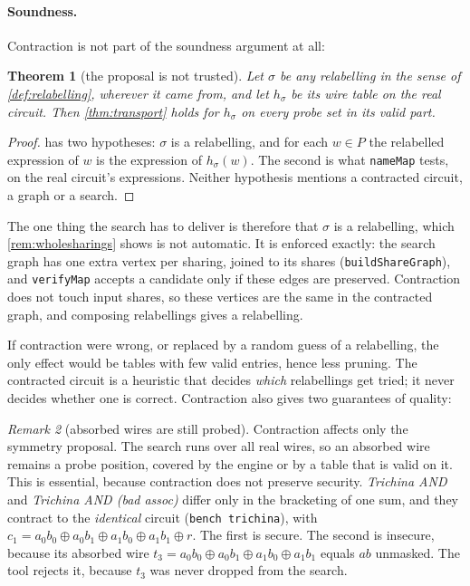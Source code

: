 \documentclass[11pt,a4paper]{article}
\newtheorem{theorem}{Theorem}[section]
\theoremstyle{definition}
\theoremstyle{remark}
\newtheorem{remark}[theorem]{Remark}
\newcommand{\code}[1]{\texttt{\small #1}}
\begin{document}
\paragraph{Soundness.}  Contraction is not part of the soundness argument at all:

\begin{theorem}[the proposal is not trusted]\label{thm:proposal}
Let $\sigma$ be \emph{any} relabelling in the sense of \cref{def:relabelling}, wherever it came
from, and let $h_\sigma$ be its wire table on the real circuit.  Then \cref{thm:transport} holds
for $h_\sigma$ on every probe set in its valid part.
\end{theorem}
\begin{proof}
 has two hypotheses: $\sigma$ is a relabelling, and for each $w\in P$ the
relabelled expression of $w$ is the expression of $h_\sigma(w)$.  The second is what
\code{nameMap} tests, on the real circuit's expressions.  Neither hypothesis mentions a
contracted circuit, a graph or a search.
\end{proof}

The one thing the search has to deliver is therefore that $\sigma$ is a relabelling, which
\cref{rem:wholesharings} shows is not automatic.  It is enforced exactly: the search graph has one
extra vertex per sharing, joined to its shares (\code{buildShareGraph}), and \code{verifyMap}
accepts a candidate only if these edges are preserved.  Contraction does not touch input shares,
so these vertices are the same in the contracted graph, and composing relabellings gives a
relabelling.

If contraction were wrong, or replaced by a random guess of a relabelling, the only effect would be
tables with few valid entries, hence less pruning.  The contracted circuit is a heuristic that
decides \emph{which} relabellings get tried; it never decides whether one is correct.  Contraction
also gives two guarantees of quality:

\begin{remark}[absorbed wires are still probed]
Contraction affects only the symmetry proposal.  The search runs over all real wires, so an absorbed
wire remains a probe position, covered by the engine or by a table that is valid on it.  This is
essential, because contraction does not preserve security.  \emph{Trichina AND} and \emph{Trichina
AND (bad assoc)} differ only in the bracketing of one sum, and they contract to the \emph{identical}
circuit (\code{bench trichina}), with $c_1 = a_0b_0\oplus a_0b_1\oplus a_1b_0\oplus a_1b_1\oplus r$.
The first is secure.  The second is insecure, because its absorbed wire
$t_3 = a_0b_0\oplus a_0b_1\oplus a_1b_0\oplus a_1b_1$ equals $ab$ unmasked.  The tool rejects it,
because $t_3$ was never dropped from the search.
\end{remark}
\end{document}
